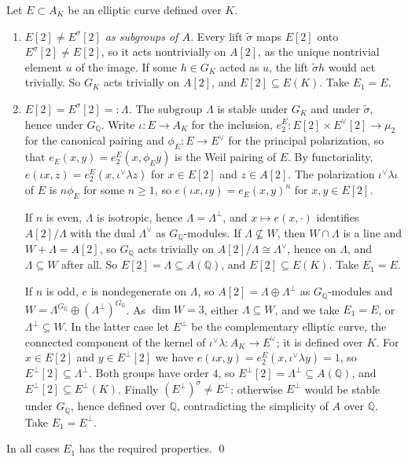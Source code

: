 \documentclass[11pt]{article}
\newcommand{\Q}{\mathbb Q}
\begin{document}
Let \(E\subset A_K\) be an elliptic curve defined over \(K\).
\begin{enumerate}
\item \emph{\(E[2]\neq E^\sigma[2]\) as subgroups of \(A\).} Every lift \(\tilde\sigma\) maps
\(E[2]\) onto \(E^\sigma[2]\neq E[2]\), so it acts nontrivially on \(A[2]\), as the unique
nontrivial element \(u\) of the image. If some \(h\in G_K\) acted as \(u\), the lift
\(\tilde\sigma h\) would act trivially. So \(G_K\) acts trivially on \(A[2]\), and
\(E[2]\subseteq E(K)\). Take \(E_1=E\).

\item \emph{\(E[2]=E^\sigma[2]=:\Lambda\).} The subgroup \(\Lambda\) is stable under \(G_K\) and
under \(\tilde\sigma\), hence under \(G_{\Q}\). Write \(\iota:E\to A_K\) for the inclusion,
\(e_2^E:E[2]\times E^\vee[2]\to\mu_2\) for the canonical pairing and \(\phi_E:E\to E^\vee\) for the
principal polarization, so that \(e_E(x,y)=e_2^E(x,\phi_E y)\) is the Weil pairing of \(E\). By
functoriality, \(e(\iota x,z)=e_2^E(x,\iota^\vee\lambda z)\) for \(x\in E[2]\) and \(z\in A[2]\).
The polarization \(\iota^\vee\lambda\iota\) of \(E\) is \(n\phi_E\) for some \(n\ge1\), so
\(e(\iota x,\iota y)=e_E(x,y)^n\) for \(x,y\in E[2]\).

If \(n\) is even, \(\Lambda\) is isotropic, hence \(\Lambda=\Lambda^\perp\), and \(x\mapsto
e(x,\cdot)\) identifies \(A[2]/\Lambda\) with the dual \(\Lambda^\vee\) as \(G_{\Q}\)-modules. If
\(\Lambda\not\subseteq W\), then \(W\cap\Lambda\) is a line and \(W+\Lambda=A[2]\), so \(G_{\Q}\)
acts trivially on \(A[2]/\Lambda\cong\Lambda^\vee\), hence on \(\Lambda\), and
\(\Lambda\subseteq W\) after all. So \(E[2]=\Lambda\subseteq A(\Q)\), and \(E[2]\subseteq E(K)\).
Take \(E_1=E\).

If \(n\) is odd, \(e\) is nondegenerate on \(\Lambda\), so \(A[2]=\Lambda\oplus\Lambda^\perp\) as
\(G_{\Q}\)-modules and \(W=\Lambda^{G_{\Q}}\oplus(\Lambda^\perp)^{G_{\Q}}\). As \(\dim W=3\),
either \(\Lambda\subseteq W\), and we take \(E_1=E\), or \(\Lambda^\perp\subseteq W\). In the latter
case let \(E^\perp\) be the complementary elliptic curve, the connected component of the kernel of
\(\iota^\vee\lambda:A_K\to E^\vee\); it is defined over \(K\). For \(x\in E[2]\) and \(y\in
E^\perp[2]\) we have \(e(\iota x,y)=e_2^E(x,\iota^\vee\lambda y)=1\), so
\(E^\perp[2]\subseteq\Lambda^\perp\). Both groups have order \(4\), so
\(E^\perp[2]=\Lambda^\perp\subseteq A(\Q)\), and \(E^\perp[2]\subseteq E^\perp(K)\). Finally
\((E^\perp)^\sigma\neq E^\perp\): otherwise \(E^\perp\) would be stable under \(G_{\Q}\), hence
defined over \(\Q\), contradicting the simplicity of \(A\) over \(\Q\). Take \(E_1=E^\perp\).
\end{enumerate}
In all cases \(E_1\) has the required properties. \qed
\end{document}
